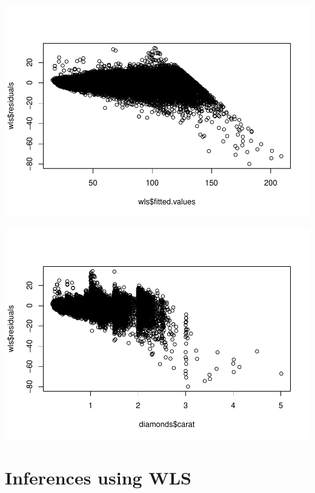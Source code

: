 \documentclass[
]{book}
\newenvironment{Shaded}{\begin{snugshade}}{\end{snugshade}}
\newcommand{\FunctionTok}[1]{\textcolor[rgb]{0.00,0.00,0.00}{#1}}
\newcommand{\NormalTok}[1]{#1}
\newcommand{\SpecialCharTok}[1]{\textcolor[rgb]{0.00,0.00,0.00}{#1}}
\begin{document}
\includegraphics{13-MultipleLinearRegression_files/figure-latex/unnamed-chunk-10-2.pdf}

\begin{Shaded}
\end{Shaded}

\includegraphics{13-MultipleLinearRegression_files/figure-latex/unnamed-chunk-10-3.pdf}

\hypertarget{inferences-using-wls}{%
\section{Inferences using WLS}\label{inferences-using-wls}}
\end{document}
